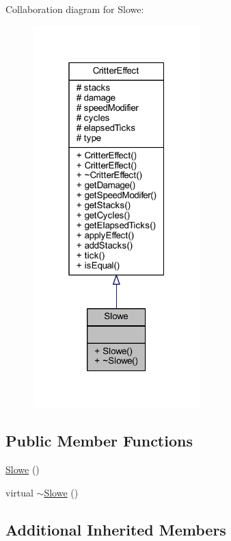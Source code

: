 Collaboration diagram for Slowe\+:
\nopagebreak
\begin{figure}[H]
\begin{center}
\leavevmode
\includegraphics[width=184pt]{struct_slowe__coll__graph}
\end{center}
\end{figure}
\subsection*{Public Member Functions}
\begin{DoxyCompactItemize}
\item 
\hyperlink{struct_slowe_afb6b3b5a3322e8eefe31789e69270cb8}{Slowe} ()
\item 
virtual \hyperlink{struct_slowe_a29af66a89be468dd314ee265320f7b3c}{$\sim$\+Slowe} ()
\end{DoxyCompactItemize}
\subsection*{Additional Inherited Members}


